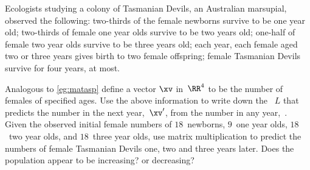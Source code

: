 \begin{exercise}  
Ecologists studying a colony of Tasmanian Devils, an Australian marsupial, observed the following:
two-thirds of the female newborns survive to be one year old;
two-thirds of female one year olds survive to be two years old;
one-half of female two year olds survive to be three years old;
each year, each female aged two or three years gives birth to two female offspring;
female Tasmanian Devils survive for four years, at most.

Analogous to \autoref{eg:matasp} define a vector \(\xv\) in~\(\RR^4\) to be the number of females of specified ages.
Use the above information to write down the ~\(L\) that predicts the number in the next year,~\(\xv'\), from the number in any year,~\xv.
Given the observed initial female numbers of \(18\)~newborns, \(9\)~one year olds, \(18\)~two year olds, and \(18\)~three year olds, use matrix multiplication to predict the numbers of female Tasmanian Devils one, two and three years later.
Does the population appear to be increasing? or decreasing?
\end{exercise}


